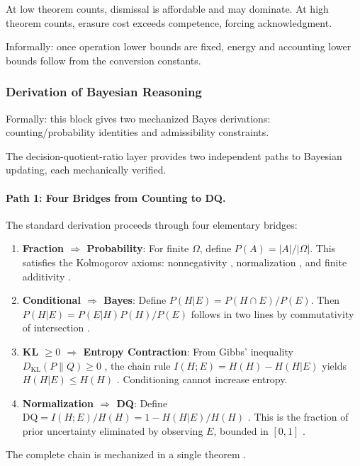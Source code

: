\begin{corollary}\label{cor:theorem-equilibrium}
At low theorem counts, dismissal is affordable and may dominate. At high theorem counts, erasure cost exceeds competence, forcing acknowledgment.
\end{corollary}

Informally: once operation lower bounds are fixed, energy and accounting lower bounds follow from the conversion constants.

\subsubsection{Derivation of Bayesian Reasoning}

Formally: this block gives two mechanized Bayes derivations: counting/probability identities and admissibility constraints.

The decision-quotient-ratio layer provides two independent paths to Bayesian updating, each mechanically verified.

\paragraph{Path 1: Four Bridges from Counting to DQ.}
The standard derivation proceeds through four elementary bridges:
\begin{enumerate}
  \item \textbf{Fraction $\Rightarrow$ Probability}: For finite $\Omega$, define $P(A) = |A|/|\Omega|$. This satisfies the Kolmogorov axioms: nonnegativity , normalization , and finite additivity .
  \item \textbf{Conditional $\Rightarrow$ Bayes}: Define $P(H|E) = P(H \cap E)/P(E)$. Then $P(H|E) = P(E|H) P(H) / P(E)$ follows in two lines by commutativity of intersection .
  \item \textbf{KL $\geq 0$ $\Rightarrow$ Entropy Contraction}: From Gibbs' inequality $D_{\text{KL}}(P \| Q) \geq 0$ , the chain rule $I(H;E) = H(H) - H(H|E)$ yields $H(H|E) \leq H(H)$ . Conditioning cannot increase entropy.
  \item \textbf{Normalization $\Rightarrow$ DQ}: Define $\text{DQ} = I(H;E)/H(H) = 1 - H(H|E)/H(H)$ . This is the fraction of prior uncertainty eliminated by observing $E$, bounded in $[0,1]$ .
\end{enumerate}
The complete chain is mechanized in a single theorem .

